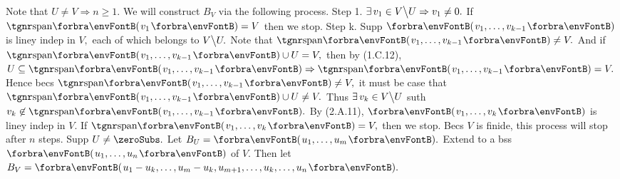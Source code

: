 \vspace{8pt}


\TextB{\vspace{0pt}}
Note that $U\neq V\Rightarrow n\geqslant 1.$ We will construct $B_V$ via the following process.\TextB{}
{\tgbfx Step 1.} $\exists\,v_1\in V\big\backslash U\Rightarrow v_1\neq 0.$ If $\Span{v_1}=V$ then we stop.\TextB{}
{\tgbfx Step k.} Supp $\Par{v_1,\dots,v_{k-1}}$ is liney indep in $V,$ each of which belongs to $V\big\backslash U.$\TextB{}
 Note that $\Span{v_1,\dots,v_{k-1}}\neq V.$ And if $\Span{v_1,\dots,v_{k-1}}\cup U=V,$ then by (1.C.12),\TextB{}
  $U\subseteq \Span{v_1,\dots,v_{k-1}}\Rightarrow\Span{v_1,\dots,v_{k-1}}=V.$\TextB{}
 Hence becs $\Span{v_1,\dots,v_{k-1}}\neq V,$ it must be case that $\Span{v_1,\dots,v_{k-1}}\cup U\neq V.$\TextB{}
 Thus $\exists\,v_k\in V\big\backslash U$ suth $v_k\not\in\Span{v_1,\dots,v_{k-1}}.$\TextB{}
 By (2.A.11), $\Par{v_1,\dots,v_k}$ is liney indep in $V$. If $\Span{v_1,\dots,v_k}=V,$ then we stop.\TextB{}
Becs $V$ is finide, this process will stop after $n$ steps.\PfEnd\vspace{4pt}\TextB{}
\Or Supp $U\neq\zeroSubs.$ Let $B_U=\Par{u_1,\dots,u_m}.$ Extend to a bss $\Par{u_1,\dots,u_n}$ of $V.$\TextB{}
\Blind{\Or}Then let $B_V=\Par{u_1-u_k,\dots,u_m-u_k,u_{m+1},\dots,u_k,\dots,u_n}.$\PfEnd
\SepLine

